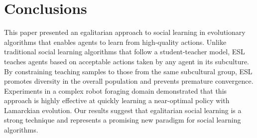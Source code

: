 \documentclass{sig-alternate}
\begin{document}
\section{Conclusions}
\label{sec:conclusions}

This paper presented an egalitarian approach to social learning in evolutionary algorithms that enables agents to learn from high-quality actions. Unlike traditional social learning algorithms that follow a student-teacher model, ESL teaches agents based on acceptable actions taken by any agent in its subculture. By constraining teaching samples to those from the same subcultural group, ESL promotes diversity in the overall population and prevents premature convergence. Experiments in a complex robot foraging domain demonstrated that this approach is highly effective at quickly learning a near-optimal policy with Lamarckian evolution. Our results suggest that egalitarian social learning is a strong technique and represents a promising new paradigm for social learning algorithms.



\end{document}
